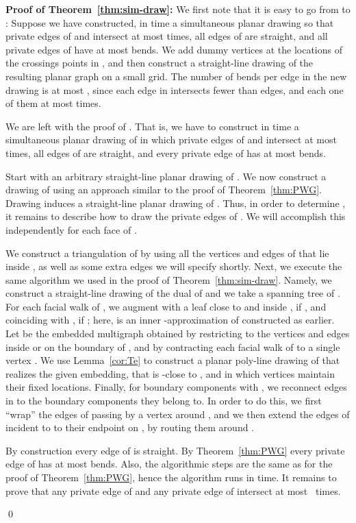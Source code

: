 \documentclass{llncs}
\newenvironment{proofof}[1]{\par\addvspace\topsep\noindent
{\bf Proof #1:} \ignorespaces }{\qed}
\begin{document}
\begin{proofof}{of Theorem~\ref{thm:sim-draw}}
We first note that it is easy to go from  to : Suppose
we have constructed, in time  a simultaneous planar drawing  so that private edges of  and  intersect at most  times, all edges of  are straight, and all private edges of  have at most  bends. We add dummy
vertices at the locations of the  crossings points in , and then construct a straight-line drawing of the resulting planar graph on a small grid. The number of bends per edge in the new drawing is at most , since each edge in  intersects fewer than  edges, and each one of them at most  times.

We are left with the proof of . That is, we have to construct in time  a simultaneous planar drawing of  in which private edges of  and  intersect at most  times, all edges of  are straight, and every private edge of  has at most  bends.

Start with an arbitrary straight-line planar drawing  of . We now construct a drawing  of  using an approach similar to the proof of Theorem~\ref{thm:PWG}. Drawing  induces a straight-line planar drawing  of . Thus, in order to determine , it remains to describe how to draw the private edges of . We will accomplish this independently for each face  of .

We construct a triangulation  of  by using all the vertices and edges of  that lie inside , as well as some extra edges we will specify shortly. Next, we execute the same algorithm we used in the proof of Theorem~\ref{thm:sim-draw}.  Namely, we construct a straight-line drawing of the dual  of  and we take a spanning tree  of . For each facial walk  of , we augment  with a leaf   close to  and inside , if , and coinciding with , if ; here,  is an inner -approximation of  constructed as earlier. Let  be the embedded multigraph obtained by restricting  to the vertices and edges inside or on the boundary of , and by contracting each facial walk  of  to a single vertex . We use Lemma~\ref{cor:Te} to construct a planar poly-line drawing of  that realizes the given embedding, that is -close to , and in which vertices  maintain their fixed locations. Finally, for boundary components with , we reconnect edges in  to the boundary components they belong to. In order to do this, we first ``wrap'' the edges of  passing by a vertex  around , and we then extend the edges of  incident to  to their endpoint on , by routing them around .

By construction every edge of  is straight. By Theorem~\ref{thm:PWG} every private edge of  has at most  bends. Also, the algorithmic steps are the same as for the proof of Theorem~\ref{thm:PWG}, hence the algorithm runs in  time. It remains to prove that any private edge of  and any private edge of  intersect at most ~times.


\end{proofof}
\end{document}
